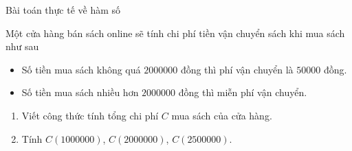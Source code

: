 \begin{dang}{Bài toán thực tế về hàm số}
	
\end{dang}
\viduminhhoa
\begin{vd}%
	Một cửa hàng bán sách online sẽ tính chi phí tiền vận chuyển sách khi mua sách như sau
	\begin{itemize}
		\item Số tiền mua sách không quá $2000000$ đồng thì phí vận chuyển là $50000$ đồng.
		\item Số tiền mua sách nhiều hơn $2000000$ đồng thì miễn phí vận chuyển.
	\end{itemize}
	\begin{enumerate}
		\item Viết công thức tính tổng chi phí $C$ mua sách của cửa hàng.
		\item Tính $C(1000000)$, $C(2000000)$, $C(2500000)$.
	\end{enumerate}
\end{vd}
